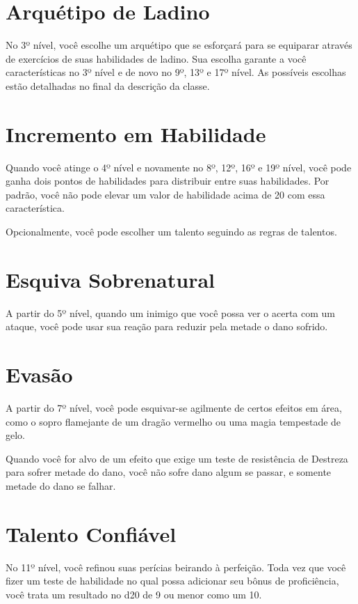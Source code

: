 \documentclass{RPG_Adventure}[2021/10/20]
\begin{document}
\begin{multicols}{2}
\section*{Arquétipo de Ladino}%

No 3º nível, você escolhe um arquétipo que se esforçará para se equiparar
através de exercícios de suas habilidades de ladino. Sua escolha garante a você
características no 3º nível e de novo no 9º, 13º e 17º nível. As possíveis
escolhas estão detalhadas no final da descrição da classe.

\section*{Incremento em Habilidade}%

Quando você atinge o 4º nível e novamente no 8º, 12º, 16º e 19º nível, você pode
ganha dois pontos de habilidades para distribuir entre suas habilidades. Por
padrão, você não pode elevar um valor de habilidade acima de 20 com essa
característica.

Opcionalmente, você pode escolher um talento seguindo as regras de talentos.

\section*{Esquiva Sobrenatural}%

A partir do 5º nível, quando um inimigo que você possa ver o acerta com um
ataque, você pode usar sua reação para reduzir pela metade o dano sofrido.

\section*{Evasão}%

A partir do 7º nível, você pode esquivar-se agilmente de certos efeitos em área,
como o sopro flamejante de um dragão vermelho ou uma magia tempestade de gelo.

Quando você for alvo de um efeito que exige um teste de resistência de Destreza
para sofrer metade do dano, você não sofre dano algum se passar, e somente
metade do dano se falhar.

\section*{Talento Confiável}%

No 11º nível, você refinou suas perícias beirando à perfeição. Toda vez que você
fizer um teste de habilidade no qual possa adicionar seu bônus de proficiência,
você trata um resultado no d20 de 9 ou menor como um 10.


\end{multicols}
\end{document}
